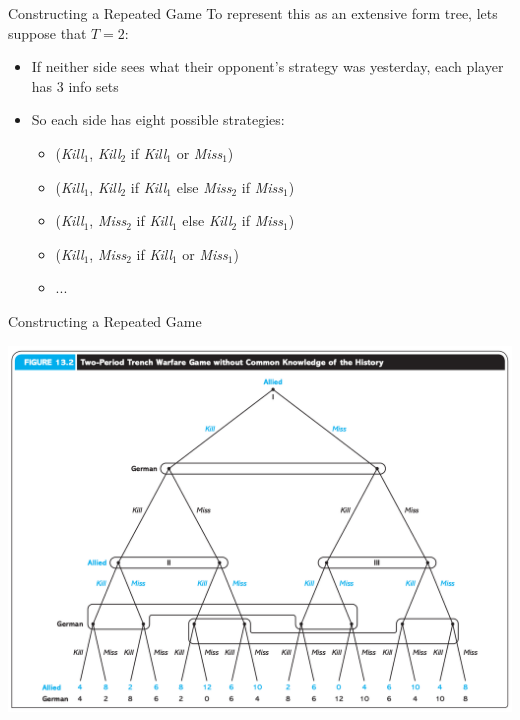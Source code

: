 \begin{frame}{Constructing a Repeated Game}
  To represent this as an extensive form tree, lets suppose that $T=2$:
  \begin{itemize}
    \item If neither side sees what their opponent's strategy was yesterday, each player has 3 info sets
    \item So each side has eight possible strategies:
    \begin{itemize}
      \item (\textit{Kill$_1$}, \textit{Kill$_2$} if \textit{Kill$_1$} or \textit{Miss$_1$})
      \item (\textit{Kill$_1$}, \textit{Kill$_2$} if \textit{Kill$_1$} else \textit{Miss$_2$} if \textit{Miss$_1$})
      \item (\textit{Kill$_1$}, \textit{Miss$_2$} if \textit{Kill$_1$} else \textit{Kill$_2$} if \textit{Miss$_1$})
      \item (\textit{Kill$_1$}, \textit{Miss$_2$} if \textit{Kill$_1$} or \textit{Miss$_1$})
      \item ...
    \end{itemize}
  \end{itemize}
\end{frame}

\begin{frame}{Constructing a Repeated Game}
  \begin{center}
    \includegraphics[width=1\textwidth]{figures/fig132.png} 
  \end{center} 
\end{frame}

